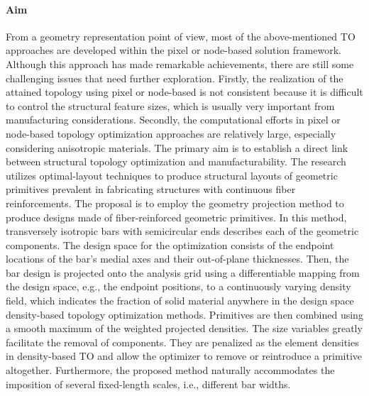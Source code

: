 \paragraph{Aim}From a geometry representation point of view, most of the above-mentioned TO approaches are developed within the pixel or node-based solution framework. Although this approach has made remarkable achievements, there are still some challenging issues that need further exploration. Firstly, the realization of the attained topology using pixel or node-based is not consistent because it is difficult to control the structural feature sizes, which is usually very important from manufacturing considerations. Secondly, the computational efforts in pixel or node-based topology optimization approaches are relatively large, especially considering anisotropic materials. 
The primary aim is to establish a direct link between structural topology optimization and manufacturability. The research utilizes optimal-layout techniques to produce structural layouts of geometric primitives prevalent in fabricating structures with continuous fiber reinforcements. The proposal is to employ the geometry projection method to produce designs made of fiber-reinforced geometric primitives. In this method, transversely isotropic bars with semicircular ends describes each of the geometric components.  The design space for the optimization consists of the endpoint locations of the bar's medial axes and their out-of-plane thicknesses. Then, the bar design is projected onto the analysis grid using a differentiable mapping from the design space, e.g., the endpoint positions, to a continuously varying density field, which indicates the fraction of solid material anywhere in the design space density-based topology optimization methods.  Primitives are then combined using a smooth maximum of the weighted projected densities. The size variables greatly facilitate the removal of components. They are penalized as the element densities in density-based TO and allow the optimizer to remove or reintroduce a primitive altogether. Furthermore, the proposed method naturally accommodates the imposition of several fixed-length scales, i.e., different bar widths.  

